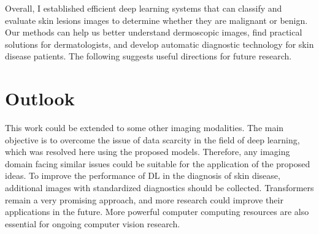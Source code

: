 Overall, I established efficient deep learning systems that can classify and evaluate skin lesions images to determine whether they are malignant or benign. Our methods can help us better understand dermoscopic images, find practical solutions for dermatologists, and develop automatic diagnostic technology for skin disease patients. The following suggests useful directions for future research.

\section{Outlook} \label{sec:fw}
 
This work could be extended to some other imaging modalities. The main objective is to overcome the issue of data scarcity in the field of deep learning, which was resolved here using the proposed models. Therefore, any imaging domain facing similar issues could be suitable for the application of the proposed ideas. To improve the performance of DL in the diagnosis of skin disease, additional images with standardized diagnostics should be collected. Transformers remain a very promising approach, and more research could improve their applications in the future. More powerful computer computing resources are also essential for ongoing computer vision research.

